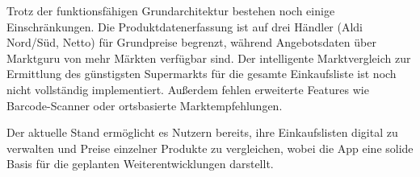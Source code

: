 Trotz der funktionsfähigen Grundarchitektur bestehen noch einige Einschränkungen. Die Produktdatenerfassung ist auf drei Händler (Aldi Nord/Süd, Netto) für Grundpreise begrenzt, während Angebotsdaten über Marktguru von mehr Märkten verfügbar sind. Der intelligente Marktvergleich zur Ermittlung des günstigsten Supermarkts für die gesamte Einkaufsliste ist noch nicht vollständig implementiert. Außerdem fehlen erweiterte Features wie Barcode-Scanner oder ortsbasierte Marktempfehlungen.

Der aktuelle Stand ermöglicht es Nutzern bereits, ihre Einkaufslisten digital zu verwalten und Preise einzelner Produkte zu vergleichen, wobei die App eine solide Basis für die geplanten Weiterentwicklungen darstellt.
